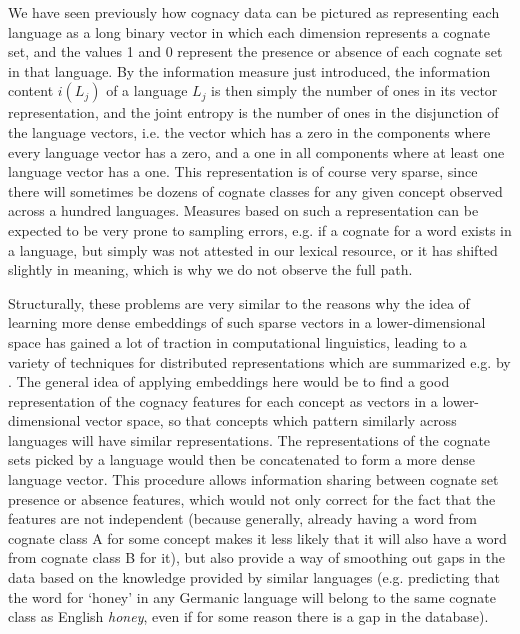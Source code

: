 We have seen previously how cognacy data can be pictured as representing each language as a long binary vector in which each dimension represents a cognate set, and the values 1 and 0 represent the presence or absence of each cognate set in that language. By the information measure just introduced, the information content $i(L_j)$ of a language $L_j$ is then simply the number of ones in its vector representation, and the joint entropy is the number of ones in the disjunction of the language vectors, i.e. the vector which has a zero in the components where every language vector has a zero, and a one in all components where at least one language vector has a one. This representation is of course very sparse, since there will sometimes be dozens of cognate classes for any given concept observed across a hundred languages. Measures based on such a representation can be expected to be very prone to sampling errors, e.g. if a cognate for a word exists in a language, but simply was not attested in our lexical 
resource, or it has shifted slightly in meaning, which is why we do not observe the full path. 

Structurally, these problems are very similar to the reasons why the idea of learning more dense embeddings of such sparse vectors in a lower-dimensional space has gained a lot of traction in computational linguistics, leading to a variety of techniques for distributed representations which are summarized e.g. by \cite{goldberg2016}. The general idea of applying embeddings here would be to find a good representation of the cognacy features for each concept as vectors in a lower-dimensional vector space, so that concepts which pattern similarly across languages will have similar representations. The representations of the cognate sets picked by a language would then be concatenated to form a more dense language vector. This procedure allows information sharing between cognate set presence or absence features, which would not only correct for the fact that the features are not independent (because generally, already having a word from cognate class A for some concept makes it less likely that it will also have a word from cognate class B for it), but also provide a way of smoothing out gaps in the data based on the knowledge provided by similar languages (e.g. predicting that the word for `honey' in any Germanic language will belong to the same cognate class as English \textit{honey}, even if for some reason there is a gap in the database).

